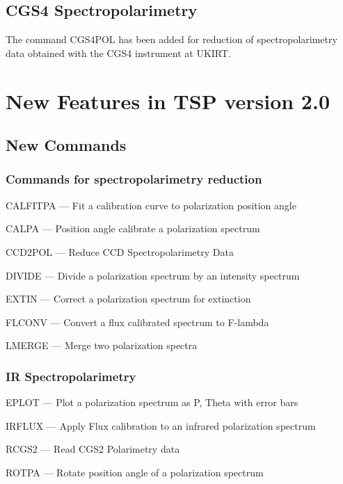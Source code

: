 \subsection{CGS4 Spectropolarimetry}

The command CGS4POL has been added for reduction of spectropolarimetry
data obtained with the CGS4 instrument at UKIRT.

\section{New Features in TSP version 2.0}

\subsection{New Commands}

\subsubsection{Commands for spectropolarimetry reduction}

\begin{description}

\item{CALFITPA} --- Fit a calibration curve to polarization position angle

\item{CALPA} --- Position angle calibrate a polarization spectrum

\item{CCD2POL} --- Reduce CCD Spectropolarimetry Data

\item{DIVIDE} --- Divide a polarization spectrum by an intensity spectrum

\item{EXTIN} --- Correct a polarization spectrum for extinction

\item{FLCONV} --- Convert a flux calibrated spectrum to F-lambda

\item{LMERGE} --- Merge two polarization spectra

\end{description}

\subsubsection{IR Spectropolarimetry}

\begin{description}

\item{EPLOT} --- Plot a polarization spectrum as P, Theta with error bars

\item{IRFLUX} --- Apply Flux calibration to an infrared polarization spectrum

\item{RCGS2} --- Read CGS2 Polarimetry data

\item{ROTPA} --- Rotate position angle of a polarization spectrum

\end{description}

